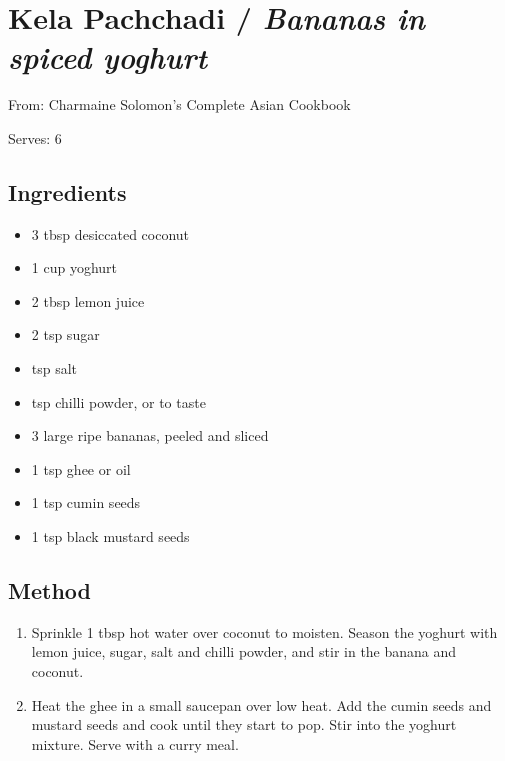 \section{Kela Pachchadi / \emph{Bananas in spiced yoghurt}}


From: Charmaine Solomon's Complete Asian Cookbook

Serves: 6

\subsection{Ingredients}

\begin{itemize}
	\item 3 tbsp desiccated coconut 
	\item 1 cup yoghurt 
	\item 2 tbsp lemon juice 
	\item 2 tsp sugar 
	\item {} tsp salt 
	\item {} tsp chilli powder, or to taste 
	\item 3 large ripe bananas, peeled and sliced 
	\item 1 tsp ghee or oil 
	\item 1 tsp cumin seeds 
	\item 1 tsp black mustard seeds
\end{itemize}

\subsection{Method}

\begin{enumerate}
	\item Sprinkle 1 tbsp hot water over coconut to moisten. Season the yoghurt with lemon juice, sugar, salt and chilli powder, and stir in the banana and coconut. 
	\item Heat the ghee in a small saucepan over low heat. Add the cumin seeds and mustard seeds and cook until they start to pop. Stir into the yoghurt mixture. Serve with a curry meal. 
\end{enumerate}
